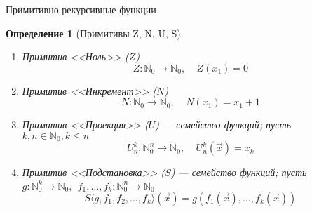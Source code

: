 \documentclass[aspectratio=169]{beamer}
\newtheorem{dfn}{Определение}[section]
\begin{document}
\begin{frame}{Примитивно-рекурсивные функции}

\begin{dfn}[Примитивы Z, N, U, S]
\begin{enumerate}
\item Примитив <<Ноль>> ($Z$) \vspace{-0.3cm}
$$Z: \mathbb{N}_0\to\mathbb{N}_0,\ \ \ \ \ Z(x_1) = 0$$\vspace{-0.5cm}\pause
\item Примитив <<Инкремент>> ($N$) \vspace{-0.3cm}
$$N: \mathbb{N}_0\to\mathbb{N}_0,\ \ \ \ \ N(x_1) = x_1+1$$\vspace{-0.5cm}\pause
\item Примитив <<Проекция>> ($U$) — семейство функций; пусть $k,n \in \mathbb{N}_0, k \le n$\vspace{-0.3cm}
$$U^k_n: \mathbb{N}^n_0 \to \mathbb{N}_0,\ \ \ \ \ U^k_n(\overrightarrow{x}) = x_k$$\vspace{-0.5cm}\pause
\item Примитив <<Подстановка>> ($S$) --- семейство функций; пусть $g: \mathbb{N}^k_0 \to \mathbb{N}_0,\ \ f_1,\dots,f_k: \mathbb{N}^n_0 \to \mathbb{N}_0$
 \vspace{-0.3cm}
$$S\langle g,f_1,f_2,\dots,f_k \rangle (\overrightarrow{x}) = g(f_1(\overrightarrow{x}),\dots,f_k(\overrightarrow{x}))$$
\end{enumerate}
\end{dfn}
\end{frame}
\end{document}
